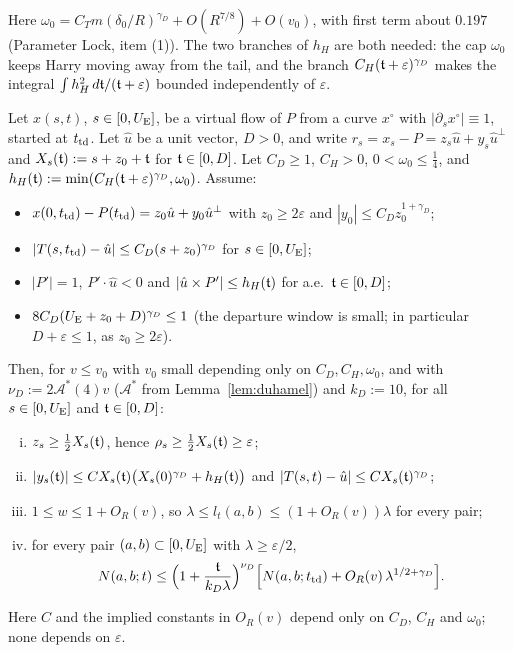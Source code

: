 Here $\omega_0=C_Tm(\delta_0/R)^{\gamma_D}+O(R^{7/8})+O(v_0)$, with first term about $0.197$ (Parameter Lock, item
(1)). The two branches of $h_H$ are both needed: the cap $\omega_0$ keeps Harry moving away from the tail, and the branch
$C_H(\mathfrak{t}+\varepsilon)^{\gamma_D}$ makes the integral $\int h_H^2\,d\mathfrak{t}/(\mathfrak{t}+\varepsilon)$ bounded independently of
$\varepsilon$.

\begin{theorem}[Departure]\label{thm:departure}
Let $x(s,t)$, $s\in[0,U_{\mathrm{E}}]$, be a virtual flow of $P$ from a curve $x^\circ$ with $|\partial_sx^\circ|\equiv1$, started
at $t_{\mathrm{td}}$. Let $\hat u$ be a unit vector, $D>0$, and write $r_s=x_s-P=z_s\hat u+y_s\hat u^\perp$ and
$X_s(\mathfrak{t}):=s+z_0+\mathfrak{t}$ for $\mathfrak{t}\in[0,D]$. Let $C_D\ge1$, $C_H>0$, $0<\omega_0\le\frac14$, and
$h_H(\mathfrak{t}):=\min(C_H(\mathfrak{t}+\varepsilon)^{\gamma_D},\omega_0)$. Assume:
\begin{itemize}
\setlength{\itemsep}{1pt}\setlength{\parskip}{0pt}
\item[\textup{(D0)}] $x(0,t_{\mathrm{td}})-P(t_{\mathrm{td}})=z_0\hat u+y_0\hat u^\perp$ with $z_0\ge2\varepsilon$ and $|y_0|\le C_Dz_0^{1+\gamma_D}$;
\item[\textup{(D1)}] $|T(s,t_{\mathrm{td}})-\hat u|\le C_D(s+z_0)^{\gamma_D}$ for $s\in[0,U_{\mathrm{E}}]$;
\item[\textup{(D2)}] $|P'|=1$, $P'\cdot\hat u<0$ and $|\hat u\times P'|\le h_H(\mathfrak{t})$ for a.e.\ $\mathfrak{t}\in[0,D]$;
\item[\textup{(D3)}] $8C_D(U_{\mathrm{E}}+z_0+D)^{\gamma_D}\le1$ \textup(the departure window is small; in particular
$D+\varepsilon\le1$, as $z_0\ge2\varepsilon$\textup).
\end{itemize}
Then, for $v\le v_0$ with $v_0$ small depending only on $C_D,C_H,\omega_0$, and with $\nu_D:=2\mathcal A^*(4)v$
\textup($\mathcal A^*$ from Lemma~\ref{lem:duhamel}\textup) and $k_D:=10$, for all $s\in[0,U_{\mathrm{E}}]$ and $\mathfrak{t}\in[0,D]$:
\begin{enumerate}[(i)]
\setlength{\itemsep}{1pt}\setlength{\parskip}{0pt}
\item $z_s\ge\frac12X_s(\mathfrak{t})$, hence $\rho_s\ge\frac12X_s(\mathfrak{t})\ge\varepsilon$;
\item $|y_s(\mathfrak{t})|\le CX_s(\mathfrak{t})\bigl(X_s(0)^{\gamma_D}+h_H(\mathfrak{t})\bigr)$ and $|T(s,t)-\hat u|\le CX_s(\mathfrak{t})^{\gamma_D}$;
\item $1\le w\le1+O_R(v)$, so $\lambda\le l_t(a,b)\le(1+O_R(v))\lambda$ for every pair;
\item for every pair $(a,b)\subset[0,U_{\mathrm{E}}]$ with $\lambda\ge\varepsilon/2$,
\[
N(a,b;t)\le\Bigl(1+\frac{\mathfrak{t}}{k_D\lambda}\Bigr)^{\nu_D}\Bigl[N(a,b;t_{\mathrm{td}})+O_R(v)\,\lambda^{1/2+\gamma_D}\Bigr].
\]
\end{enumerate}
Here $C$ and the implied constants in $O_R(v)$ depend only on $C_D$, $C_H$ and $\omega_0$; none depends on $\varepsilon$.
\end{theorem}

